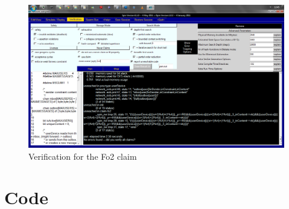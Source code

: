 \documentclass[9pt,a4paper]{article}
\begin{document}
	\begin{figure}[t]
		\includegraphics[angle=90,totalheight=\textheight]{screenshots/verification_fo2.png}
		\caption{Verification for the Fo2 claim}
		\label{veriFo2}
	\end{figure}
	
	\section{Code}


	
\end{document}
